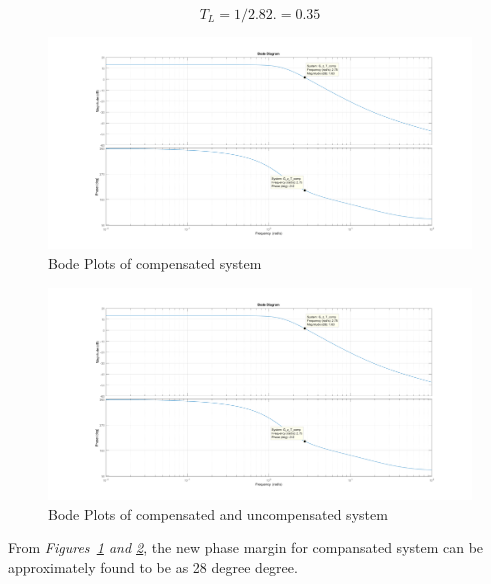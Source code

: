 \documentclass[a4paper,12pt]{article}
\begin{document}
\begin{enumerate}
	$$ T_L=1/2.82.=0.35 $$
	
	\begin{figure}[H]
			\center
			\setlength{\unitlength}{\textwidth} 
		\includegraphics[width=1.0\unitlength]{images/comped2b}
  		\caption{\label{fig:k}Bode Plots of compensated system}
	\end{figure}
	
	\begin{figure}[H]
			\center
			\setlength{\unitlength}{\textwidth} 
		\includegraphics[width=1.0\unitlength]{images/comped2b}
  		\caption{\label{fig:l}Bode Plots of compensated and uncompensated system}
	\end{figure}
	
	From \textit{Figures~\ref{fig:k} and \ref{fig:l}}, the new phase margin for compansated system can be approximately found to be as 28 degree degree.
	

\end{enumerate}
\end{document}
